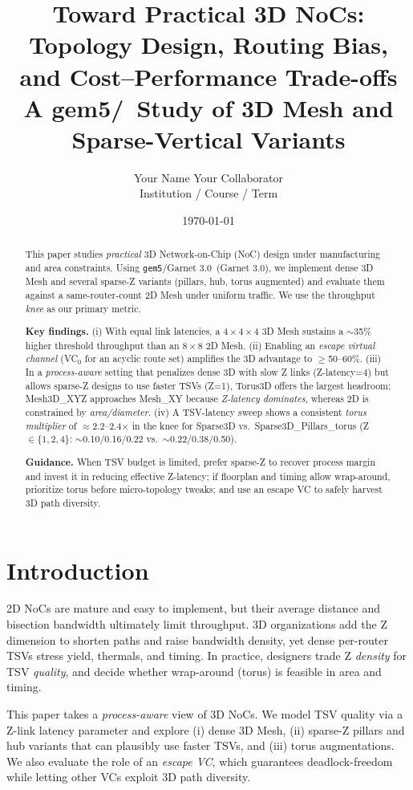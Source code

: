 \documentclass[11pt]{article}
\title{\textbf{Toward Practical 3D NoCs: Topology Design, Routing Bias, and Cost--Performance Trade-offs}\\
\large A gem5/\Ruby\ Study of 3D Mesh and Sparse-Vertical Variants}
\author{Your Name \quad Your Collaborator\\[2pt]
\small Institution / Course / Term}
\date{\today}
\newcommand{\Ruby}{Garnet 3.0}
\begin{document}
\maketitle
\doublespacing
\begin{abstract}
This paper studies \emph{practical} 3D Network-on-Chip (NoC) design under
manufacturing and area constraints. Using \texttt{gem5}/\Ruby\ (Garnet 3.0),
we implement dense 3D Mesh and several sparse-Z variants (pillars, hub, torus
augmented) and evaluate them against a same-router-count 2D Mesh under
uniform traffic. We use the throughput \emph{knee} as our primary metric.

\textbf{Key findings.} (i) With equal link latencies, a $4{\times}4{\times}4$
3D Mesh sustains a $\sim$35\% higher threshold throughput than an $8{\times}8$
2D Mesh. (ii) Enabling an \emph{escape virtual channel} (VC$_0$ for an acyclic
route set) amplifies the 3D advantage to $\ge$50--60\%. (iii) In a
\emph{process-aware} setting that penalizes dense 3D with slow Z links
(Z-latency=4) but allows sparse-Z designs to use faster TSVs (Z=1), Torus3D
offers the largest headroom; Mesh3D\_XYZ approaches Mesh\_XY because
\emph{Z-latency dominates}, whereas 2D is constrained by \emph{area/diameter}.
(iv) A TSV-latency sweep shows a consistent \emph{torus multiplier} of
$\approx$2.2–2.4$\times$ in the knee for Sparse3D vs.\ Sparse3D\_Pillars\_torus
(Z$\in\{1,2,4\}$: $\sim$0.10/0.16/0.22 vs.\ $\sim$0.22/0.38/0.50).

\textbf{Guidance.} When TSV budget is limited, prefer sparse-Z to recover
process margin and invest it in reducing effective Z-latency; if floorplan and
timing allow wrap-around, prioritize torus before micro-topology tweaks; and
use an escape VC to safely harvest 3D path diversity.
\end{abstract}

\section{Introduction}
2D NoCs are mature and easy to implement, but their average distance and
bisection bandwidth ultimately limit throughput. 3D organizations add the
Z dimension to shorten paths and raise bandwidth density, yet dense per-router
TSVs stress yield, thermals, and timing. In practice, designers trade Z
\emph{density} for TSV \emph{quality}, and decide whether wrap-around (torus)
is feasible in area and timing.

This paper takes a \emph{process-aware} view of 3D NoCs. We model TSV quality
via a Z-link latency parameter and explore (i) dense 3D Mesh, (ii) sparse-Z
pillars and hub variants that can plausibly use faster TSVs, and (iii) torus
augmentations. We also evaluate the role of an \emph{escape VC}, which
guarantees deadlock-freedom while letting other VCs exploit 3D path diversity.
\end{document}
